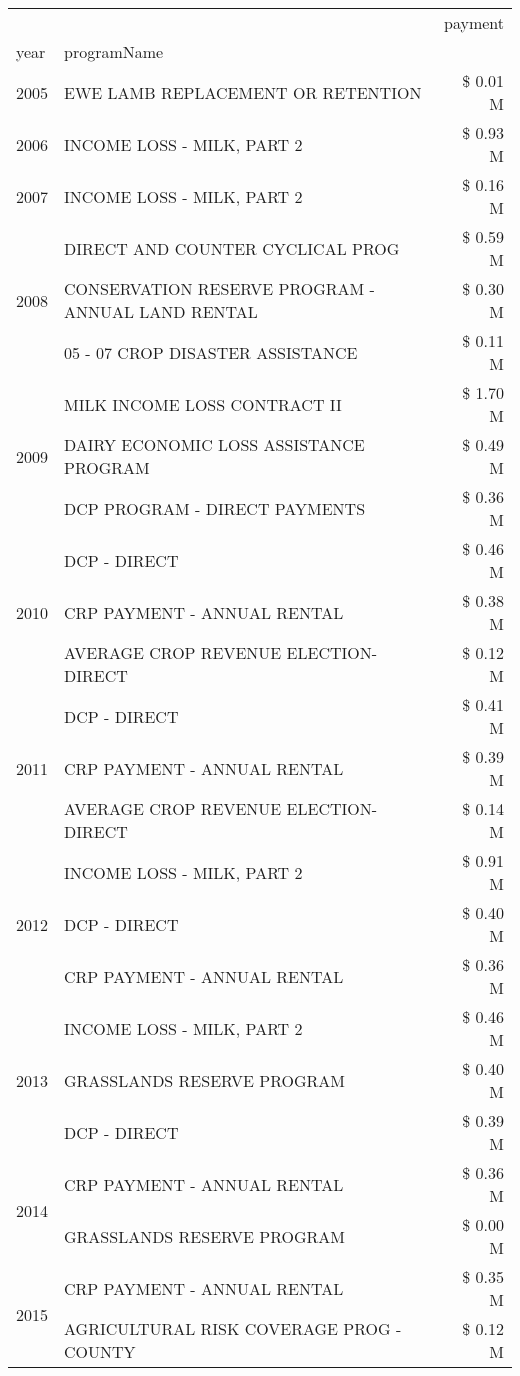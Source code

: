 \begin{tabular}{llr}
\toprule
 &  & payment \\
year & programName &  \\
\midrule
2005 & EWE LAMB REPLACEMENT OR RETENTION & \$ 0.01 M \\
\cline{1-3}
2006 & INCOME LOSS - MILK, PART 2 & \$ 0.93 M \\
\cline{1-3}
2007 & INCOME LOSS - MILK, PART 2 & \$ 0.16 M \\
\cline{1-3}
\multirow[t]{3}{*}{2008} & DIRECT AND COUNTER CYCLICAL PROG & \$ 0.59 M \\
 & CONSERVATION RESERVE PROGRAM - ANNUAL LAND RENTAL & \$ 0.30 M \\
 & 05 - 07 CROP DISASTER ASSISTANCE & \$ 0.11 M \\
\cline{1-3}
\multirow[t]{3}{*}{2009} & MILK INCOME LOSS CONTRACT II & \$ 1.70 M \\
 & DAIRY ECONOMIC LOSS ASSISTANCE PROGRAM & \$ 0.49 M \\
 & DCP PROGRAM - DIRECT PAYMENTS & \$ 0.36 M \\
\cline{1-3}
\multirow[t]{3}{*}{2010} & DCP - DIRECT & \$ 0.46 M \\
 & CRP PAYMENT - ANNUAL RENTAL & \$ 0.38 M \\
 & AVERAGE CROP REVENUE ELECTION-DIRECT & \$ 0.12 M \\
\cline{1-3}
\multirow[t]{3}{*}{2011} & DCP - DIRECT & \$ 0.41 M \\
 & CRP PAYMENT - ANNUAL RENTAL & \$ 0.39 M \\
 & AVERAGE CROP REVENUE ELECTION-DIRECT & \$ 0.14 M \\
\cline{1-3}
\multirow[t]{3}{*}{2012} & INCOME LOSS - MILK, PART 2 & \$ 0.91 M \\
 & DCP - DIRECT & \$ 0.40 M \\
 & CRP PAYMENT - ANNUAL RENTAL & \$ 0.36 M \\
\cline{1-3}
\multirow[t]{3}{*}{2013} & INCOME LOSS - MILK, PART 2 & \$ 0.46 M \\
 & GRASSLANDS RESERVE PROGRAM & \$ 0.40 M \\
 & DCP - DIRECT & \$ 0.39 M \\
\cline{1-3}
\multirow[t]{2}{*}{2014} & CRP PAYMENT - ANNUAL RENTAL & \$ 0.36 M \\
 & GRASSLANDS RESERVE PROGRAM & \$ 0.00 M \\
\cline{1-3}
\multirow[t]{3}{*}{2015} & CRP PAYMENT - ANNUAL RENTAL & \$ 0.35 M \\
 & AGRICULTURAL RISK COVERAGE PROG - COUNTY & \$ 0.12 M \\

\end{tabular}
